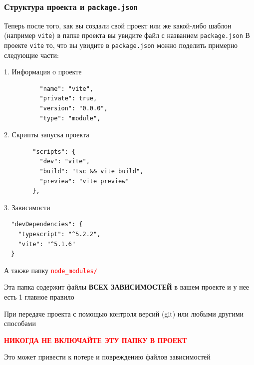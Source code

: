 \documentclass[aspectratio=169]{beamer}
\begin{document}

\begin{frame}
  \frametitle{Структура проекта и \texttt{package.json}}
  Теперь после того, как вы создали свой проект или же какой-либо шаблон (например \texttt{vite}) в папке проекта вы увидите файл с названием \texttt{package.json}
  \bigskip
  В проекте \texttt{vite} то, что вы увидите в \texttt{package.json} можно поделить примерно следующие части:
  
    \begin{block}{1. Информация о проекте}
      \begin{verbatim}
          "name": "vite",
          "private": true,
          "version": "0.0.0",
          "type": "module",
      \end{verbatim}
    \end{block}

        \begin{block}{2. Скрипты запуска проекта}
      \begin{verbatim}
        "scripts": {
          "dev": "vite",
          "build": "tsc && vite build",
          "preview": "vite preview"
        },
      \end{verbatim}
    \end{block}

        \begin{block}{3. Зависимости}
      \begin{verbatim}
  "devDependencies": {
    "typescript": "^5.2.2",
    "vite": "^5.1.6"
  }
      \end{verbatim}
    \end{block}
    
    
    А также папку \textcolor{red}{\texttt{node\_modules/}}

    \framebreak

    Эта папка содержит файлы \textbf{ВСЕХ ЗАВИСИМОСТЕЙ} в вашем проекте и у нее есть 1 главное правило
    
    \begin{center}
      При передаче проекта с помощью контроля версий (git) или любыми другими способами
    \end{center}
    
      \begin{center}
        
      \textcolor{red}{\textbf{НИКОГДА НЕ ВКЛЮЧАЙТЕ ЭТУ ПАПКУ В ПРОЕКТ }}
    \end{center}

    \begin{center}
      Это может привести к потере и повреждению файлов зависимостей
    \end{center}
    
  \end{frame}
\end{document}
